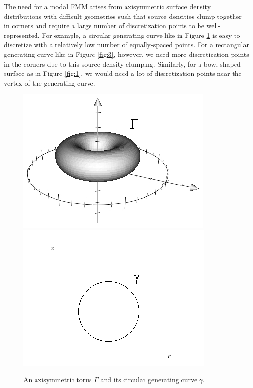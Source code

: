 \documentclass[11pt, oneside]{article}   	%
\begin{document}
The need for a modal FMM arises from axisymmetric surface density distributions with difficult geometries such that source densities clump together in corners and require a large number of discretization points to be well-represented. For example, a circular generating curve like in Figure \ref{fig:2} is easy to discretize with a relatively low number of equally-spaced points. For a rectangular generating curve like in Figure \ref{fig:3}, however, we need more discretization points in the corners due to this source density clumping. Similarly, for a bowl-shaped surface as in Figure \ref{fig:1}, we would need a lot of discretization points near the vertex of the generating curve.
\begin{figure}[h]
\caption{An axisymmetric torus $\Gamma$ and its circular generating curve $\gamma$.}
\label{fig:2}
\centering
\includegraphics[scale=0.5]{./images/torus}
\includegraphics[scale=0.5]{./images/circle}
\end{figure}
\end{document}

